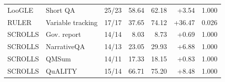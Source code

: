 \begin{table}[H]
\begin{tabular}{llrrrrr}
LooGLE & Short QA & 25/23 & 58.64 & 62.18 & +3.54 & 1.000 \\
RULER & Variable tracking & 17/17 & 37.65 & 74.12 & +36.47 & 0.026 \\
SCROLLS & Gov. report & 14/14 & 8.03 & 8.73 & +0.69 & 1.000 \\
SCROLLS & NarrativeQA & 14/13 & 23.05 & 29.93 & +6.88 & 1.000 \\
SCROLLS & QMSum & 14/11 & 17.33 & 18.15 & +0.83 & 1.000 \\
SCROLLS & QuALITY & 15/14 & 66.71 & 75.20 & +8.48 & 1.000 \\
\bottomrule
\end{tabular}
\end{table}
